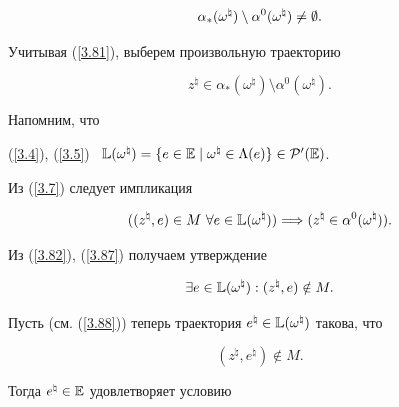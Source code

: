 \begin{pf}
\begin{equation}\label{3.81}


{{\alpha}_*}({\omega}^\natural) \setminus


{{\alpha}^0}({\omega}^\natural) \ne \emp.


\end{equation}


Учитывая (\ref{3.81}), выберем произвольную траекторию


\begin{equation}\label{3.82}


z^\natural \in {{\alpha}_*}({\omega}^\natural) \setminus


{{\alpha}^0}({\omega}^\natural).


\end{equation}


Напомним, что


(\ref{3.4}), (\ref{3.5}) \ $\Bbb{L}({\omega}^\natural)=\{e\in \Bbb{E} \mid


{{\omega}^\natural} \in {{\Ld}(e)}\} \in {\cal{P}}'(\Bbb{E})$.


Из (\ref{3.7}) следует импликация


\begin{equation}\label{3.87}


(({z^\natural},e) \in M \ \fo{e} \in \Bbb{L}({\omega}^\natural))


\Lo ({z^\natural} \in {{\alpha}^0}({\omega}^\natural)).


\end{equation}


Из (\ref{3.82}), (\ref{3.87}) получаем утверждение


\begin{equation}\label{3.88}


\exi{e} \in \Bbb{L}({\omega}^\natural):({z^\natural},e) \notin M.


\end{equation}


Пусть (см. (\ref{3.88})) теперь траектория ${e^\natural} \in


\Bbb{L}({\omega}^\natural)$ такова, что


\begin{equation}\label{3.90}


({z^\natural},{e^\natural}) \notin M.


\end{equation}


Тогда ${e^\natural} \in \Bbb{E}$ удовлетворяет условию



\end{pf}
